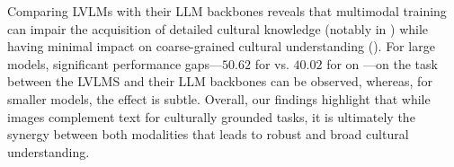 %
Comparing LVLMs with their LLM backbones reveals that multimodal training can impair the acquisition of detailed cultural knowledge (notably in \ckqad) while having minimal impact on coarse-grained cultural understanding (\coqa).
%
For large models, significant performance gaps---$50.62$ for  vs. $40.02$ for  on \RegAP---on the \ckqad task between the LVLMS and their LLM backbones can be observed, whereas, for smaller models, the effect is subtle.
%
Overall, our findings highlight that while images complement text for culturally grounded tasks, it is ultimately the synergy between both modalities that leads to robust and broad cultural understanding.
%
